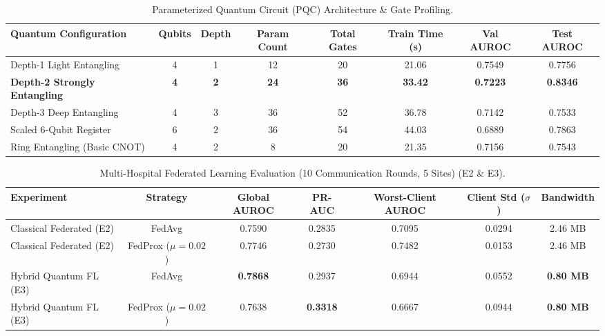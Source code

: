 \documentclass{article}
\begin{document}
\vspace{1em}

\begin{table}[htbp]
\centering
\small
\caption{Parameterized Quantum Circuit (PQC) Architecture & Gate Profiling.}
\label{tab:quantum_scaling}
\begin{tabular}{lccccccc}
\toprule
\textbf{Quantum Configuration} & \textbf{Qubits} & \textbf{Depth} & \textbf{Param Count} & \textbf{Total Gates} & \textbf{Train Time (s)} & \textbf{Val AUROC} & \textbf{Test AUROC} \\
\midrule
Depth-1 Light Entangling & 4 & 1 & 12 & 20 & 21.06 & 0.7549 & 0.7756 \\
\textbf{Depth-2 Strongly Entangling} & \textbf{4} & \textbf{2} & \textbf{24} & \textbf{36} & \textbf{33.42} & \textbf{0.7223} & \textbf{0.8346} \\
Depth-3 Deep Entangling & 4 & 3 & 36 & 52 & 36.78 & 0.7142 & 0.7533 \\
Scaled 6-Qubit Register & 6 & 2 & 36 & 54 & 44.03 & 0.6889 & 0.7863 \\
Ring Entangling (Basic CNOT) & 4 & 2 & 8 & 20 & 21.35 & 0.7156 & 0.7543 \\
\bottomrule
\end{tabular}
\end{table}

\vspace{1em}

\begin{table}[htbp]
\centering
\small
\caption{Multi-Hospital Federated Learning Evaluation (10 Communication Rounds, 5 Sites) (E2 \& E3).}
\label{tab:federated_experiments}
\begin{tabular}{lcccccc}
\toprule
\textbf{Experiment} & \textbf{Strategy} & \textbf{Global AUROC} & \textbf{PR-AUC} & \textbf{Worst-Client AUROC} & \textbf{Client Std ($\sigma$)} & \textbf{Bandwidth} \\
\midrule
Classical Federated (E2) & FedAvg & 0.7590 & 0.2835 & 0.7095 & 0.0294 & 2.46 MB \\
Classical Federated (E2) & FedProx ($\mu=0.02$) & 0.7746 & 0.2730 & 0.7482 & 0.0153 & 2.46 MB \\
Hybrid Quantum FL (E3) & FedAvg & \textbf{0.7868} & 0.2937 & 0.6944 & 0.0552 & \textbf{0.80 MB} \\
Hybrid Quantum FL (E3) & FedProx ($\mu=0.02$) & 0.7638 & \textbf{0.3318} & 0.6667 & 0.0944 & \textbf{0.80 MB} \\
\bottomrule
\end{tabular}
\end{table}
\end{document}
